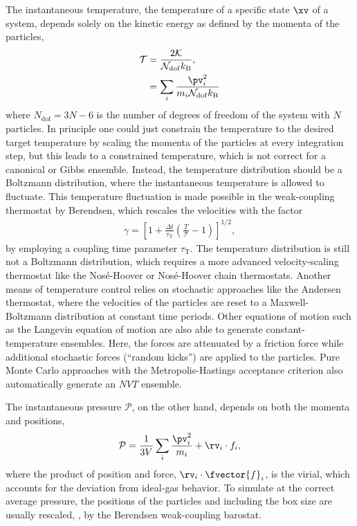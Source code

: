 The instantaneous temperature, \ie{} the temperature of a specific state $\xv$
of a system, depends solely on the kinetic energy
as defined by 
the momenta of the particles,
%
\begin{align}
 \mathcal{T} &= \frac{2 \mathcal{K}}{\mathcal{N}_\mathrm{dof} k_\mathrm{B}},\\
 &=\sum_i\frac{\pv_i^2}{m_i\mathcal{N}_\mathrm{dof} k_\mathrm{B}} \nonumber
\end{align}
%
where $N_{\mathrm{dof}}=3N-6$ is the number of degrees of freedom of the system with $N$ particles.
%
In principle one could just constrain the temperature to the desired target temperature
by scaling the momenta of the particles at every integration step, but this leads
to a constrained 
temperature, which is
not correct for a canonical or Gibbs ensemble. 
%
Instead, the temperature distribution should be a Boltzmann distribution,
where the instantaneous temperature is allowed to fluctuate.
This temperature fluctuation is made possible in the weak-coupling thermostat
by Berendsen\cite{BE84.1}, which rescales the velocities  with the factor
%
\begin{align}
 \gamma = \left[ 1 + \frac{\Delta t}{\tau_\mathrm{T}} \left( \frac{T}{\mathcal{T}} - 1 \right) \right]^{1/2},
\end{align}
%
%
by employing a coupling time parameter $\tau_{\mathrm{T}}$. The
temperature distribution is still not a Boltzmann distribution, which requires
a more advanced velocity-scaling thermostat like the Nos\'e-Hoover\cite{NO84.1,NO84.2,HO85.1}
or Nos\'e-Hoover chain\cite{MA92.1} thermostats.
%
Another means of temperature control 
relies on
stochastic approaches like the Andersen thermostat,\cite{AN80.1} where the velocities
of the particles are reset to a Maxwell-Boltzmann distribution at constant time periods.
Other equations of motion such as the Langevin equation of motion 
are also able to generate constant-temperature ensembles. Here, the forces are attenuated
by a friction force while additional stochastic forces (``random kicks'') are applied
to the particles.
Pure Monte Carlo approaches with the Metropolis-Hastings acceptance criterion\cite{HA70.4} also automatically generate 
an $NVT$ ensemble. 


The instantaneous pressure $\mathcal{P}$, on the other hand, depends
on both the momenta and positions,
%
\begin{align}
 \mathcal{P} = \frac{1}{3V}\sum_i \frac{\pv_i^2}{m_i}+\rv_i\cdot f_i
,
\end{align}
%
where the product of position and force, $\rv_i\cdot\fvector{f}_i$,  is the virial, 
which accounts for the deviation from ideal-gas behavior.
%
To simulate at the correct average pressure, the positions of the particles 
and including the box size are usually rescaled, \eg{},  by the Berendsen 
weak-coupling barostat.\cite{BE84.1}




